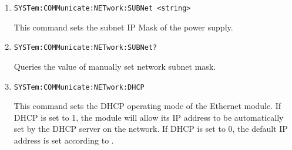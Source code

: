 \documentclass[a4paper,10pt]{article}
\begin{document}
\begin{enumerate}
\begin{enumerate}
		    \begin{description}
		        *
	        \end{description}
	    \item 
	        \begin{verbatim}SYSTem:COMMunicate:NETwork:SUBNet <string>\end{verbatim}
	        \begin{description}
	            This command sets the subnet IP Mask of the power supply.
	        \end{description}
	    \item 
	        \begin{verbatim}SYSTem:COMMunicate:NETwork:SUBNet?\end{verbatim}
	        \begin{description}
		        Queries the value of manually set network subnet mask.
		    \end{description}
		\item 
		    \begin{verbatim}SYSTem:COMMunicate:NETwork:DHCP\end{verbatim}
		    \begin{description}
		        This command sets the DHCP operating mode of the Ethernet module. If DHCP is set to 1, the module will allow its IP address to be automatically set by the DHCP server on the network. If DHCP is set to 0, the default IP address is set according to .

\end{description}
\end{enumerate}
\end{enumerate}
\end{document}
